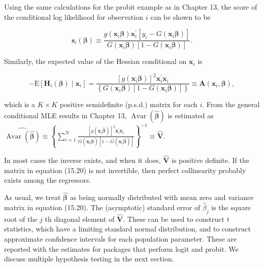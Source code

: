 \documentclass[10pt]{article}
\begin{document}
Using the same calculations for the probit example as in Chapter 13, the score of the conditional log likelihood for observation $i$ can be shown to be


\begin{equation*}
\mathbf{s}_{i}(\boldsymbol{\beta}) \equiv \frac{g\left(\mathbf{x}_{i} \boldsymbol{\beta}\right) \mathbf{x}_{i}^{\prime}\left[y_{i}-G\left(\mathbf{x}_{i} \boldsymbol{\beta}\right)\right]}{G\left(\mathbf{x}_{i} \boldsymbol{\beta}\right)\left[1-G\left(\mathbf{x}_{i} \boldsymbol{\beta}\right)\right]} . \tag{15.18}
\end{equation*}


Similarly, the expected value of the Hessian conditional on $\mathbf{x}_{i}$ is


\begin{equation*}
-\mathrm{E}\left[\mathbf{H}_{i}(\boldsymbol{\beta}) \mid \mathbf{x}_{i}\right]=\frac{\left[g\left(\mathbf{x}_{i} \boldsymbol{\beta}\right)\right]^{2} \mathbf{x}_{i}^{\prime} \mathbf{x}_{i}}{\left\{G\left(\mathbf{x}_{i} \boldsymbol{\beta}\right)\left[1-G\left(\mathbf{x}_{i} \boldsymbol{\beta}\right)\right]\right\}} \equiv \mathbf{A}\left(\mathbf{x}_{i}, \boldsymbol{\beta}\right), \tag{15.19}
\end{equation*}


which is a $K \times K$ positive semidefinite (p.s.d.) matrix for each $i$. From the general conditional MLE results in Chapter 13, $\operatorname{Avar}(\hat{\boldsymbol{\beta}})$ is estimated as\\
$\widehat{\operatorname{Avar}(\hat{\boldsymbol{\beta}})} \equiv\left\{\sum_{i=1}^{N} \frac{\left[g\left(\mathbf{x}_{i} \hat{\boldsymbol{\beta}}\right)\right]^{2} \mathbf{x}_{i}^{\prime} \mathbf{x}_{i}}{G\left(\mathbf{x}_{i} \hat{\boldsymbol{\beta}}\right)\left[1-G\left(\mathbf{x}_{i} \hat{\boldsymbol{\beta}}\right)\right]}\right\}^{-1} \equiv \hat{\mathbf{V}}$.

In most cases the inverse exists, and when it does, $\hat{\mathbf{V}}$ is positive definite. If the matrix in equation (15.20) is not invertible, then perfect collinearity probably exists among the regressors.

As usual, we treat $\hat{\boldsymbol{\beta}}$ as being normally distributed with mean zero and variance matrix in equation (15.20). The (asymptotic) standard error of $\hat{\beta}_{j}$ is the square root of the $j$ th diagonal element of $\hat{\mathbf{V}}$. These can be used to construct $t$ statistics, which have a limiting standard normal distribution, and to construct approximate confidence intervals for each population parameter. These are reported with the estimates for packages that perform logit and probit. We discuss multiple hypothesis testing in the next section.
\end{document}
